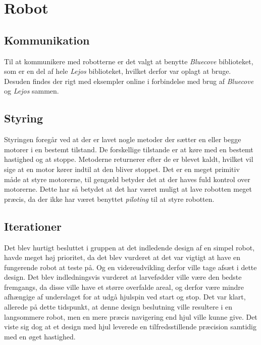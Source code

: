 \chapter{Robot}

\section{Kommunikation}
Til at kommunikere med robotterne er det valgt at benytte \textit{Bluecove} biblioteket, som er en del af hele \textit{Lejos} biblioteket, hvilket derfor var oplagt at bruge. Desuden findes der rigt med eksempler online i forbindelse med brug af \textit{Bluecove} og \textit{Lejos} sammen.

\section{Styring}
Styringen foregår ved at der er lavet nogle metoder der sætter en eller begge motorer i en bestemt tilstand. De forskellige tilstande er at køre med en bestemt hastighed og at stoppe. Metoderne returnerer efter de er blevet kaldt, hvilket vil sige at en motor kører indtil at den bliver stoppet. Det er en meget primitiv måde at styre motorerne, til gengæld betyder det at der haves fuld kontrol over motorerne.
Dette har så betydet at det har været muligt at lave robotten meget præcis, da der ikke har været benyttet \textit{piloting} til at styre robotten.

\section{Iterationer}
Det blev hurtigt besluttet i gruppen at det indledende design af en simpel robot, havde meget høj prioritet, da det blev vurderet at det var vigtigt at have en fungerende robot at teste på. Og en videreudvikling derfor ville tage afsæt i dette design.
Det blev indledningsvis vurderet at larvefødder ville være den bedste fremgangs, da disse ville have et større overfalde areal, og derfor være mindre afhængige af underslaget for at udgå hjulspin ved start og stop. Det var klart, allerede på dette tidspunkt, at denne design beslutning ville resultere i en langsommere robot, men en mere præcis navigering end hjul ville kunne give.
Det viste sig dog at et design med hjul leverede en tilfredsstillende præcision samtidig med en øget hastighed.


